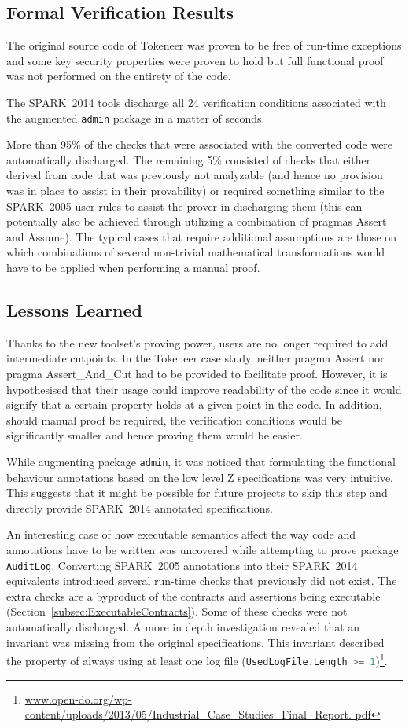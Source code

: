 \documentclass[10pt,a4paper,twocolumn]{article}
\newcommand{\oldspark}{SPARK~2005\xspace}
\newcommand{\newspark}{SPARK~2014\xspace}
\newcommand{\SPARK}[1]{\lstinline[language=Ada,basicstyle={\footnotesize
      \sffamily},framesep=0pt]$#1$}
\begin{document}
\subsection{Formal Verification Results}

The original source code of Tokeneer was proven to be free of run-time
exceptions and some key security properties were proven to hold but
full functional proof was not performed on the entirety of the code.

The \newspark tools discharge all 24 verification conditions
associated with the augmented \SPARK{admin} package in a matter of
seconds.

More than 95\% of the checks that were associated with the converted
code were automatically discharged. The remaining 5\% consisted of
checks that either derived from code that was previously not
analyzable (and hence no provision was in place to assist in their
provability) or required something similar to the \oldspark user rules
to assist the prover in discharging them (this can potentially also be
achieved through utilizing a combination of pragmas Assert and
Assume). The typical cases that require additional assumptions are
those on which combinations of several non-trivial mathematical
transformations would have to be applied when performing a manual
proof.

\subsection{Lessons Learned}

Thanks to the new toolset's proving power, users are no longer
required to add intermediate cutpoints. In the Tokeneer case study,
neither pragma Assert nor pragma Assert\_And\_Cut had to be provided
to facilitate proof. However, it is hypothesised that their usage
could improve readability of the code since it would signify that a
certain property holds at a given point in the code. In addition,
should manual proof be required, the verification conditions would be
significantly smaller and hence proving them would be easier.

While augmenting package \SPARK{admin}, it was noticed that formulating
the functional behaviour annotations based on the low level Z
specifications was very intuitive. This suggests that it might be
possible for future projects to skip this step and directly provide
\newspark annotated specifications.

An interesting case of how executable semantics affect the way code
and annotations have to be written was uncovered while attempting to
prove package \SPARK{AuditLog}. Converting \oldspark annotations into
their \newspark equivalents introduced several run-time checks that
previously did not exist. The extra checks are a byproduct of the
contracts and assertions being
executable (Section~\ref{subsec:ExecutableContracts}). Some of these checks were
not automatically discharged. A more in depth investigation revealed
that an invariant was missing from the original specifications. This
invariant described the property of always using at least one log file
(\SPARK{UsedLogFile.Length >=
1})\footnote{\url{
www.open-do.org/wp-content/uploads/2013/05/Industrial_Case_Studies_Final_Report.
pdf}}.
\end{document}
